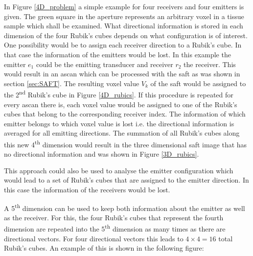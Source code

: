 In Figure \ref{4D_problem} a simple example for four receivers and four emitters is given. The green square in the aperture represents an arbitrary voxel in a tissue sample which shall be examined. What directional information is stored in each dimension of the four Rubik's cubes depends on what configuration is of interest. One possibility would be to assign each receiver direction to a Rubik's cube. In that case the information of the emitters would be lost. In this example the emitter $e_1$ could be the emitting transducer and receiver $r_2$ the receiver. This would result in an \ac{ascan} which can be processed with the \ac{saft} as was shown in section \ref{sec:SAFT}. The resulting voxel value $V_k$ of the \ac{saft} would be assigned to the 2\textsuperscript{nd} Rubik's cube in Figure \ref{4D_rubics}. If this procedure is repeated for every \ac{ascan} there is, each voxel value would be assigned to one of the Rubik's cubes that belong to the corresponding receiver index. The information of which emitter belongs to which voxel value is lost i.e. the directional information is averaged for all emitting directions. The summation of all Rubik's cubes along this new 4\textsuperscript{th} dimension would result in the three dimensional \ac{saft} image that has no directional information and was shown in Figure \ref{3D_rubics}. 

This approach could also be used to analyse the emitter configuration which would lead to a set of Rubik's cubes that are assigned to the emitter direction. In this case the information of the receivers would be lost. 

\bigskip

A 5\textsuperscript{th} dimension can be used to keep both information about the emitter as well as the receiver. For this, the four Rubik's cubes that represent the fourth dimension are repeated into the 5\textsuperscript{th} dimension as many times as there are directional vectors. For four directional vectors this leads to $4\times 4=16$ total Rubik's cubes. An example of this is shown in the following figure:

